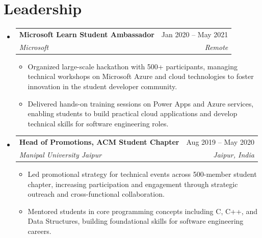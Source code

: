 \documentclass[letterpaper,11pt]{article}
\makeatletter
\newcommand{\resumeSubheading}[4]{
  \vspace{0pt}\item
    \begin{tabular*}{\textwidth}{l@{\extracolsep{\fill}}r}
      \textbf{#1} & #2 \\
      \textit{#3} & \textit{#4} \\ 
    \end{tabular*}\vspace{-6pt}
}
\newcommand{\resumeSubHeadingListStart}{\begin{itemize}[leftmargin=0pt,label={},itemsep=-2pt]}
\newcommand{\resumeSubHeadingListEnd}{\end{itemize}}
\newcommand{\resumeItemListStart}{\begin{itemize}[leftmargin=12pt, nosep, topsep=2pt]}
\newcommand{\resumeItemListEnd}{\end{itemize}}
\makeatother
\begin{document}
\section{Leadership}
  \resumeSubHeadingListStart
    \resumeSubheading
      {Microsoft Learn Student Ambassador}{Jan 2020 -- May 2021}
      {Microsoft}{Remote}
      \resumeItemListStart
        \item {Organized large-scale hackathon with 500+ participants, managing technical workshops on Microsoft Azure and cloud technologies to foster innovation in the student developer community.}
        \item {Delivered hands-on training sessions on Power Apps and Azure services, enabling students to build practical cloud applications and develop technical skills for software engineering roles.}
      \resumeItemListEnd

    \resumeSubheading
      {Head of Promotions, ACM Student Chapter}{Aug 2019 -- May 2020}
      {Manipal University Jaipur}{Jaipur, India}
      \resumeItemListStart
        \item {Led promotional strategy for technical events across 500-member student chapter, increasing participation and engagement through strategic outreach and cross-functional collaboration.}
        \item {Mentored students in core programming concepts including C, C++, and Data Structures, building foundational skills for software engineering careers.}
      \resumeItemListEnd
  \resumeSubHeadingListEnd
\end{document}
